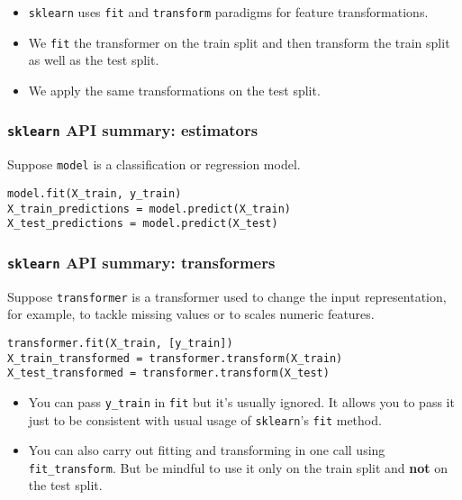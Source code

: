 \documentclass[11pt]{article}
\providecommand{\tightlist}{%
      \setlength{\itemsep}{0pt}\setlength{\parskip}{0pt}}
\begin{document}
\begin{itemize}
\tightlist
\item
  \texttt{sklearn} uses \texttt{fit} and \texttt{transform} paradigms
  for feature transformations.
\item
  We \texttt{fit} the transformer on the train split and then transform
  the train split as well as the test split.
\item
  We apply the same transformations on the test split.
\end{itemize}

    \subsubsection{\texorpdfstring{\texttt{sklearn} API summary:
estimators}{sklearn API summary: estimators}}\label{sklearn-api-summary-estimators}

Suppose \texttt{model} is a classification or regression model.

\begin{verbatim}
model.fit(X_train, y_train)
X_train_predictions = model.predict(X_train)
X_test_predictions = model.predict(X_test)
\end{verbatim}

    \subsubsection{\texorpdfstring{\texttt{sklearn} API summary:
transformers}{sklearn API summary: transformers}}\label{sklearn-api-summary-transformers}

Suppose \texttt{transformer} is a transformer used to change the input
representation, for example, to tackle missing values or to scales
numeric features.

\begin{verbatim}
transformer.fit(X_train, [y_train])
X_train_transformed = transformer.transform(X_train)
X_test_transformed = transformer.transform(X_test)
\end{verbatim}

    \begin{itemize}
\tightlist
\item
  You can pass \texttt{y\_train} in \texttt{fit} but it's usually
  ignored. It allows you to pass it just to be consistent with usual
  usage of \texttt{sklearn}'s \texttt{fit} method.\\
\item
  You can also carry out fitting and transforming in one call using
  \texttt{fit\_transform}. But be mindful to use it only on the train
  split and \textbf{not} on the test split.
\end{itemize}
\end{document}
